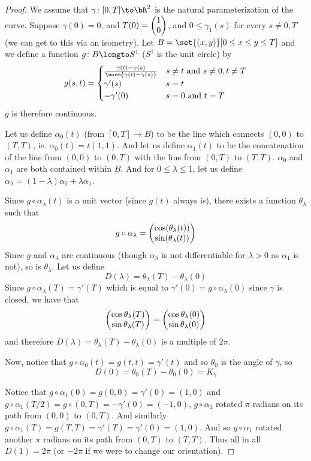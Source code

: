 \begin{proof}

    We assume that $\gamma\colon[0,T]\to\bR^2$ is the natural parameterization of the curve.
    Suppose $\gamma(0)=0$, and $T(0)=\begin{pmatrix}1\\0\end{pmatrix}$, and $0\leq\gamma_1(s)$ for every $s\neq0,T$ (we can get to this via an isometry).
    Let $B=\set{(x,y)}[0\leq x\leq y\leq T]$ and we define a function $g\colon B\longto S^1$ ($S^1$ is the unit circle) by
    \[ g(s,t) = \begin{cases} \frac{\gamma(t)-\gamma(s)}{\norm{\gamma(t)-\gamma(s)}} & s\neq t\text{ and } s\neq0,t\neq T \\ \gamma'(s) & s=t \\ -\gamma'(0) & s=0\text{ and }t=T \end{cases} \]
    $g$ is therefore continuous.

    Let us define $\alpha_0(t)$ (from $[0,T]\to B$) to be the line which connects $(0,0)$ to $(T,T)$, ie. $\alpha_0(t)=t(1,1)$.
    And let us define $\alpha_1(t)$ to be the concatenation of the line from $(0,0)$ to $(0,T)$ with the line from $(0,T)$ to $(T,T)$.
    $\alpha_0$ and $\alpha_1$ are both contained within $B$.
    And for $0\leq\lambda\leq1$, let us define $\alpha_\lambda=(1-\lambda)\alpha_0+\lambda\alpha_1$.

    Since $g\circ\alpha_\lambda(t)$ is a unit vector (since $g(t)$ always is), there exists a function $\theta_\lambda$ such that
    \[ g\circ\alpha_\lambda = \begin{pmatrix}\cos(\theta_\lambda(t)) \\ \sin(\theta_\lambda(t))\end{pmatrix} \]
    Since $g$ and $\alpha_\lambda$ are continuous (though $\alpha_\lambda$ is not differentiable for $\lambda>0$ as $\alpha_1$ is not), so is $\theta_\lambda$.
    Let us define
    \[ D(\lambda) = \theta_\lambda(T) - \theta_\lambda(0) \]
    Since $g\circ\alpha_\lambda(T)=\gamma'(T)$ which is equal to $\gamma'(0)=g\circ\alpha_\lambda(0)$ since $\gamma$ is closed, we have that
    \[ \begin{pmatrix}\cos\theta_\lambda(T) \\ \sin\theta_\lambda(T)\end{pmatrix} = \begin{pmatrix}\cos\theta_\lambda(0) \\ \sin\theta_\lambda(0)\end{pmatrix} \]
    and therefore $D(\lambda)=\theta_\lambda(T)-\theta_\lambda(0)$ is a multiple of $2\pi$.

    Now, notice that $g\circ\alpha_0(t)=g(t,t)=\gamma'(t)$ and so $\theta_0$ is the angle of $\gamma$, so
    \[ D(0) = \theta_0(T) - \theta_0(0) = K_\gamma \]

    Notice that $g\circ\alpha_1(0)=g(0,0)=\gamma'(0)=(1,0)$ and $g\circ\alpha_1(T/2)=g\circ(0,T)=-\gamma'(0)=(-1,0)$, $g\circ\alpha_1$ rotated $\pi$ radians on its path from $(0,0)$ to $(0,T)$.
    And similarly $g\circ\alpha_1(T)=g(T,T)=\gamma'(T)=\gamma'(0)=(1,0)$.
    And so $g\circ\alpha_1$ rotated another $\pi$ radians on its path from $(0,T)$ to $(T,T)$.
    Thus all in all $D(1)=2\pi$ (or $-2\pi$ if we were to change our orientation).


\end{proof}
